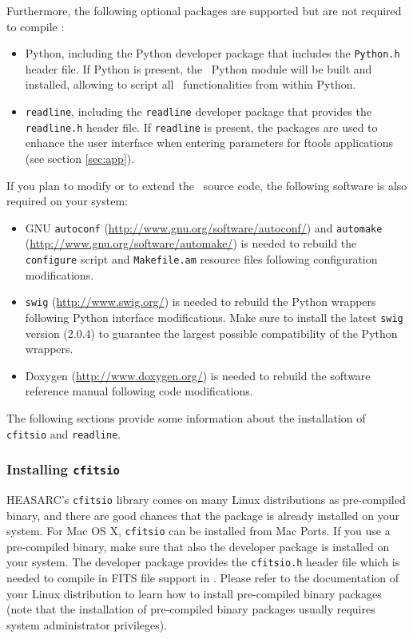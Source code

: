 \documentclass{article}[12pt,a4]
\newcommand{\swigversion}{\mbox{2.0.4}}
\begin{document}
Furthermore, the following optional packages are supported but are not required to compile \this:
\begin{itemize}
\item Python, including the Python developer package that includes the {\tt Python.h} header
file. 
If Python is present, the \this\ Python module will be built and installed, allowing to script all 
\this\ functionalities from within Python.
\item {\tt readline}, including the {\tt readline} developer package that provides
the {\tt readline.h} header file.
If {\tt readline} is present, the packages are used to enhance the user interface
when entering parameters for ftools applications (see section \ref{sec:app}).
\end{itemize}
If you plan to modify or to extend the \this\ source code, the following software is also
required on your system:
\begin{itemize}
\item GNU {\tt autoconf} (\url{http://www.gnu.org/software/autoconf/}) and {\tt automake}
(\url{http://www.gnu.org/software/automake/}) is needed to rebuild the {\tt configure}
script and {\tt Makefile.am} resource files following configuration modifications.
\item {\tt swig} (\url{http://www.swig.org/}) is needed to rebuild the Python wrappers following
Python interface modifications. Make sure to install the latest {\tt swig} version (\swigversion)
to guarantee the largest possible compatibility of the Python wrappers.
\item Doxygen (\url{http://www.doxygen.org/}) is needed to rebuild the software reference
manual following code modifications.
\end{itemize}
The following sections provide some information about the installation of {\tt cfitsio} and
{\tt readline}.

\subsubsection{Installing {\tt cfitsio}}
\label{sec:cfitsio}

HEASARC's {\tt cfitsio} library comes on many Linux distributions as pre-compiled binary,
and there are good chances that the package is already installed on your system.
For Mac OS X, {\tt cfitsio} can be installed from Mac Ports.
If you use a pre-compiled binary, make sure that also the developer package
is installed on your system.
The developer package provides the {\tt cfitsio.h} header file which is needed to compile
in FITS file support in \this.
Please refer to the documentation of your Linux distribution to learn how to install
pre-compiled binary packages (note that the installation of pre-compiled binary packages 
usually requires system administrator privileges).
\end{document}
